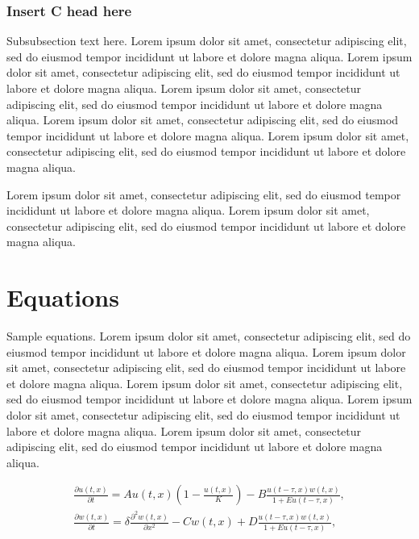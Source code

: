 \documentclass[
  journal=large,
  manuscript=物质及其变化,
  year=2020,
  volume=37,
]{cup-journal}
\begin{document}
\subsubsection{Insert C head here}
Subsubsection text here. Lorem ipsum dolor sit amet, consectetur adipiscing elit, sed do eiusmod tempor incididunt ut labore et dolore magna aliqua. Lorem ipsum dolor sit amet, consectetur adipiscing elit, sed do eiusmod tempor incididunt ut labore et dolore magna aliqua. Lorem ipsum dolor sit amet, consectetur adipiscing elit, sed do eiusmod tempor incididunt ut labore et dolore magna aliqua. Lorem ipsum dolor sit amet, consectetur adipiscing elit, sed do eiusmod tempor incididunt ut labore et dolore magna aliqua. Lorem ipsum dolor sit amet, consectetur adipiscing elit, sed do eiusmod tempor incididunt ut labore et dolore magna aliqua. 

Lorem ipsum dolor sit amet, consectetur adipiscing elit, sed do eiusmod tempor incididunt ut labore et dolore magna aliqua. Lorem ipsum dolor sit amet, consectetur adipiscing elit, sed do eiusmod tempor incididunt ut labore et dolore magna aliqua. 

\section{Equations}

Sample equations. Lorem ipsum dolor sit amet, consectetur adipiscing elit, sed do eiusmod tempor incididunt ut labore et dolore magna aliqua. Lorem ipsum dolor sit amet, consectetur adipiscing elit, sed do eiusmod tempor incididunt ut labore et dolore magna aliqua. Lorem ipsum dolor sit amet, consectetur adipiscing elit, sed do eiusmod tempor incididunt ut labore et dolore magna aliqua. Lorem ipsum dolor sit amet, consectetur adipiscing elit, sed do eiusmod tempor incididunt ut labore et dolore magna aliqua. Lorem ipsum dolor sit amet, consectetur adipiscing elit, sed do eiusmod tempor incididunt ut labore et dolore magna aliqua. 


\begin{equation}
\begin{aligned}\label{eq:first}
\frac{\partial u(t,x)}{\partial t} = Au(t,x) \left(1-\frac{u(t,x)}{K}\right)
 -B\frac{u(t-\tau,x) w(t,x)}{1+Eu(t-\tau,x)},\\
\frac{\partial w(t,x)}{\partial t} =\delta \frac{\partial^2w(t,x)}{\partial x^2}-Cw(t,x)
+D\frac{u(t-\tau,x)w(t,x)}{1+Eu(t-\tau,x)},
\end{aligned}
\end{equation}
\end{document}
